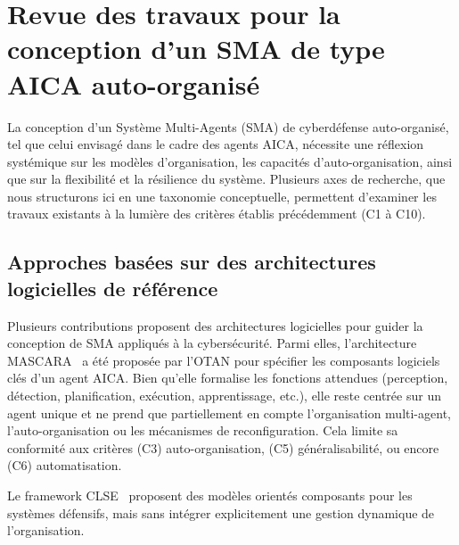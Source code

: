 \documentclass[ twoside,openright,titlepage,numbers=noenddot,headinclude,%
                footinclude=true,cleardoublepage=empty,abstractoff, %
                BCOR=5mm,paper=a4,fontsize=11pt,%
                french,american,%
                ]{scrreprt}
\begin{document}
\section{Revue des travaux pour la conception d'un SMA de type AICA auto-organisé}\label{sec:sma-conception-aica}

La conception d'un Système Multi-Agents (SMA) de cyberdéfense auto-organisé, tel que celui envisagé dans le cadre des agents AICA, nécessite une réflexion systémique sur les modèles d'organisation, les capacités d'auto-organisation, ainsi que sur la flexibilité et la résilience du système. Plusieurs axes de recherche, que nous structurons ici en une taxonomie conceptuelle, permettent d'examiner les travaux existants à la lumière des critères établis précédemment (C1 à C10).

\subsection*{Approches basées sur des architectures logicielles de référence}

Plusieurs contributions proposent des architectures logicielles pour guider la conception de SMA appliqués à la cybersécurité. Parmi elles, l'architecture MASCARA~\cite{Kott2023} a été proposée par l'OTAN pour spécifier les composants logiciels clés d'un agent AICA. Bien qu'elle formalise les fonctions attendues (perception, détection, planification, exécution, apprentissage, etc.), elle reste centrée sur un agent unique et ne prend que partiellement en compte l'organisation multi-agent, l'auto-organisation ou les mécanismes de reconfiguration. Cela limite sa conformité aux critères (C3) auto-organisation, (C5) généralisabilité, ou encore (C6) automatisation.

Le framework CLSE~\cite{Hammar2023} proposent des modèles orientés composants pour les systèmes défensifs, mais sans intégrer explicitement une gestion dynamique de l'organisation.
\end{document}
